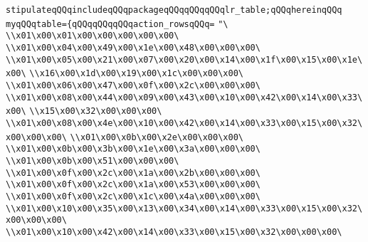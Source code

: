 \verb|stipulateqQQqincludeqQQqpackageqQQqqQQqqQQqlr_table;qQQqhereinqQQq|\newline
\verb|myqQQqtable={qQQqqQQqqQQqaction_rowsqQQq=|\newline
\verb|"\|\newline
\verb|\\x01\x00\x01\x00\x00\x00\x00\x00\|\newline
\verb|\\x01\x00\x04\x00\x49\x00\x1e\x00\x48\x00\x00\x00\|\newline
\verb|\\x01\x00\x05\x00\x21\x00\x07\x00\x20\x00\x14\x00\x1f\x00\x15\x00\x1e\x00\|\newline
\verb|\\x16\x00\x1d\x00\x19\x00\x1c\x00\x00\x00\|\newline
\verb|\\x01\x00\x06\x00\x47\x00\x0f\x00\x2c\x00\x00\x00\|\newline
\verb|\\x01\x00\x08\x00\x44\x00\x09\x00\x43\x00\x10\x00\x42\x00\x14\x00\x33\x00\|\newline
\verb|\\x15\x00\x32\x00\x00\x00\|\newline
\verb|\\x01\x00\x08\x00\x4e\x00\x10\x00\x42\x00\x14\x00\x33\x00\x15\x00\x32\x00\x00\x00\|\newline
\verb|\\x01\x00\x0b\x00\x2e\x00\x00\x00\|\newline
\verb|\\x01\x00\x0b\x00\x3b\x00\x1e\x00\x3a\x00\x00\x00\|\newline
\verb|\\x01\x00\x0b\x00\x51\x00\x00\x00\|\newline
\verb|\\x01\x00\x0f\x00\x2c\x00\x1a\x00\x2b\x00\x00\x00\|\newline
\verb|\\x01\x00\x0f\x00\x2c\x00\x1a\x00\x53\x00\x00\x00\|\newline
\verb|\\x01\x00\x0f\x00\x2c\x00\x1c\x00\x4a\x00\x00\x00\|\newline
\verb|\\x01\x00\x10\x00\x35\x00\x13\x00\x34\x00\x14\x00\x33\x00\x15\x00\x32\x00\x00\x00\|\newline
\verb|\\x01\x00\x10\x00\x42\x00\x14\x00\x33\x00\x15\x00\x32\x00\x00\x00\|\newline
